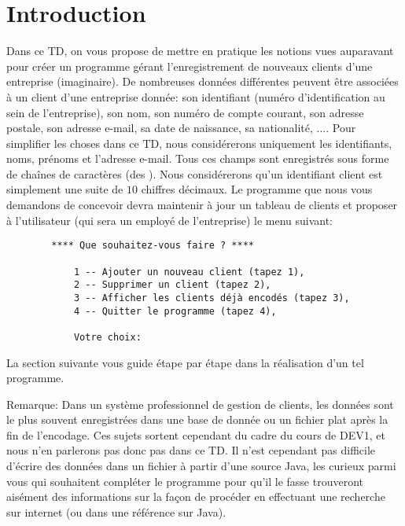 \documentclass[a4paper,11pt]{article}
\date{2018 -- 2019}
\begin{document}
\entete
\titre
{}
\lastedit

\vspace{0.5cm}

	
\section{Introduction}

	Dans ce TD, on vous propose de mettre en pratique les notions vues auparavant pour créer un programme gérant l'enregistrement de nouveaux clients d'une entreprise (imaginaire). De nombreuses données différentes peuvent être associées à un client d'une entreprise donnée: son identifiant (numéro d'identification au sein de l'entreprise), son nom, son numéro de compte courant, son adresse postale, son adresse e-mail, sa date de naissance, sa nationalité, .... Pour simplifier les choses dans ce TD, nous considérerons uniquement les identifiants, noms, prénoms et l'adresse e-mail. Tous ces champs sont enregistr\'es sous forme de cha\^ines de caract\`eres (des ). Nous considérerons qu'un identifiant client est simplement une suite de $10$ chiffres d\'ecimaux.	
	Le programme que nous vous demandons de concevoir devra maintenir \`a jour un tableau de clients et proposer \`a l'utilisateur (qui sera un employ\'e de l'entreprise) le menu suivant:
	
	\begin{verbatim}
		**** Que souhaitez-vous faire ? ****
		
			1 -- Ajouter un nouveau client (tapez 1),
			2 -- Supprimer un client (tapez 2),
			3 -- Afficher les clients déjà encodés (tapez 3),
			4 -- Quitter le programme (tapez 4),
			
			Votre choix: 
	\end{verbatim}
	
La section suivante vous guide étape par étape dans la réalisation d'un tel programme.

Remarque: Dans un syst\`eme professionnel de gestion de clients, les données sont le plus souvent enregistr\'ees dans une base de donn\'ee ou un fichier plat apr\`es la fin de l'encodage. Ces sujets sortent cependant du cadre du cours de DEV1, et nous n'en parlerons pas donc pas dans ce TD. Il n'est cependant pas difficile d'écrire des donn\'ees dans un fichier \`a partir d'une source Java, les curieux parmi vous qui souhaitent compl\'eter le programme pour qu'il le fasse trouveront ais\'ement des informations sur la fa\c con de proc\'eder en effectuant une recherche sur internet (ou dans une r\'ef\'erence sur Java).
\end{document}
